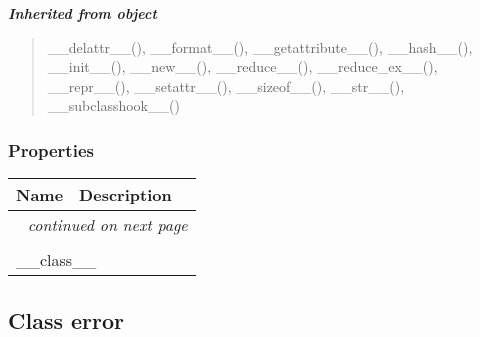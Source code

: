 \large{\textbf{\textit{Inherited from object}}}

\begin{quote}
\_\_delattr\_\_(), \_\_format\_\_(), \_\_getattribute\_\_(), \_\_hash\_\_(), \_\_init\_\_(), \_\_new\_\_(), \_\_reduce\_\_(), \_\_reduce\_ex\_\_(), \_\_repr\_\_(), \_\_setattr\_\_(), \_\_sizeof\_\_(), \_\_str\_\_(), \_\_subclasshook\_\_()
\end{quote}


  \subsubsection{Properties}

    \vspace{-1cm}
\hspace{\varindent}\begin{longtable}{|p{\varnamewidth}|p{\vardescrwidth}|l}
\cline{1-2}
\cline{1-2} \centering \textbf{Name} & \centering \textbf{Description}& \\
\cline{1-2}
\endhead\cline{1-2}\multicolumn{3}{r}{\small\textit{continued on next page}}\\\endfoot\cline{1-2}
\endlastfoot\multicolumn{2}{|l|}{\textit{Inherited from object}}\\
\multicolumn{2}{|p{\varwidth}|}{\raggedright \_\_class\_\_}\\
\cline{1-2}
\end{longtable}



\subsection{Class error}

